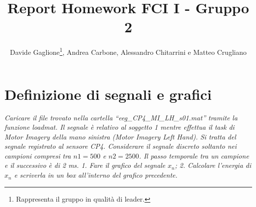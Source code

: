 \documentclass{report}
\title{\textbf{Report Homework FCI I - Gruppo 2}}
\author{Davide Gaglione\footnote{Rappresenta il gruppo in qualità di leader.}, Andrea Carbone, Alessandro Chitarrini e Matteo Crugliano}
\date{}
\begin{document}
\maketitle

\section{Definizione di segnali e grafici}

\textit{Caricare il file trovato nella cartella “eeg\_CP4\_MI\_LH\_s01.mat” tramite la funzione loadmat. Il segnale è relativo al soggetto 1 mentre effettua il task di Motor Imagery della mano sinistra (Motor Imagery Left Hand). Si tratta del segnale registrato al sensore CP4. Considerare il segnale discreto soltanto nei campioni compresi tra $n1=500$ e $n2 =2500$. Il passo temporale tra un campione e il successivo è di 2 ms. 1. Fare il grafico del segnale $x_n$; 2. Calcolare l’energia di $x_n$ e scriverla in un box all’interno del grafico precedente.}
\end{document}
